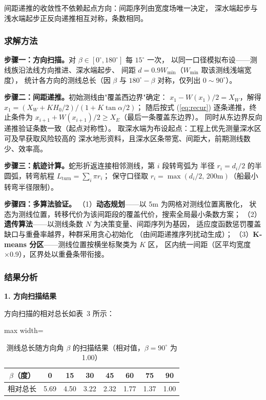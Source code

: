 \documentclass[withoutpreface,bwprint]{cumcmthesis} %
\begin{document}
间距递推的收敛性不依赖起点方向：间距序列由宽度场唯一决定，
深水端起步与浅水端起步正反向递推相互对称，条数相同。

\subsubsection{求解方法}

\textbf{步骤一：方向扫描。}对 $\beta\in[0^\circ,180^\circ]$ 每 $15^\circ$ 一次，
以同一口径模拟布设——测线族沿法线方向推进、深水端起步、
间距 $d=0.9W_{\min}$（$W_{\min}$ 取该测线浅端宽度），
统计各方向的测线总长（因 $\beta$ 与 $180^\circ-\beta$ 对称，仅列出 $0\sim90^\circ$）。

\textbf{步骤二：间距递推。}初始测线由"覆盖西边界"确定：
$x_1 - W(x_1)/2 = X_W$，解得 $x_1 = (X_W + KH_0/2)/(1+K\tan\alpha/2)$；
随后按式 (\ref{eq:recur}) 逐条递推，终止条件为
$x_{i+1}+W(x_{i+1})/2\ge X_E$（最后一条覆盖东边界）。
同时从东边界反向递推验证条数一致（起点对称性）。
取深水端为布设起点：工程上优先测量深水区可及早获取风险较高的
深水地形资料，且深水区条带宽、间距大，前期测线数少、效率高。

\textbf{步骤三：航迹计算。}蛇形折返连接相邻测线，第 $i$ 段转弯弧为
半径 $r_i=d_i/2$ 的半圆弧，转弯航程 $L_{\text{turn}}=\sum_i \pi r_i$；
保守口径取 $r_i=\max(d_i/2,\,200\text{m})$（船最小转弯半径限制）。

\textbf{步骤四：多算法验证。}
（1）\textbf{动态规划}——以 5m 为网格对测线位置离散化，
状态为测线位置，转移代价为该间距段的覆盖代价，搜索全局最小条数方案；
（2）\textbf{遗传算法}——以测线条数 $N$ 为决策变量、间距序列为基因，
适应度函数惩罚覆盖缺口与重叠率越界，种群采用贪心初始化
（由间距递推序列扰动生成）；
（3）\textbf{K-means 分区}——测线位置按横坐标聚类为 $K$ 区，
区内统一间距（区平均宽度 $\times0.9$），区界处以重叠条带衔接。

\subsubsection{结果分析}

\textbf{1. 方向扫描结果}

方向扫描的相对总长如表~3 所示：

\begin{table}[htbp]
\centering
\caption{测线总长随方向角 $\beta$ 的扫描结果（相对值，$\beta=90^\circ$ 为 1.00）}
\label{tab:q3-beta}
\begin{adjustbox}{max width=\textwidth}
\begin{tabular}{cccccccc}
\toprule[1.5pt]
$\beta$（度） & 0 & 15 & 30 & 45 & 60 & 75 & 90 \\ \midrule[1pt]
相对总长 & 5.69 & 4.50 & 3.22 & 2.32 & 1.77 & 1.37 & 1.00 \\
\bottomrule[1.5pt]
\end{tabular}
\end{adjustbox}
\end{table}
\end{document}
